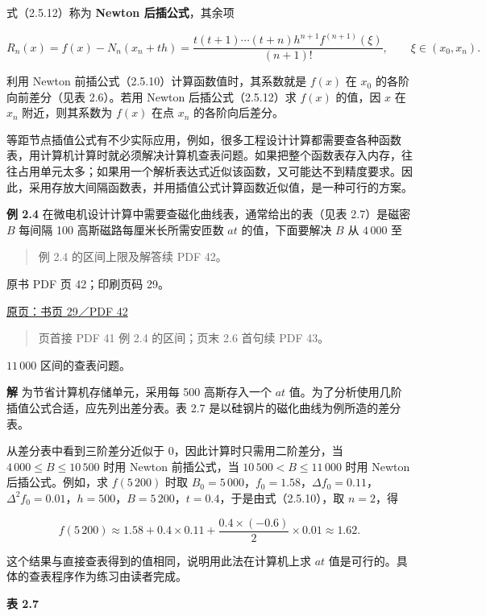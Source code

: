 式（2.5.12）称为 \textbf{Newton 后插公式}，其余项

\[
R_n(x)=f(x)-N_n(x_n+th)=\frac{t(t+1)\cdots(t+n)h^{n+1}f^{(n+1)}(\xi)}{(n+1)!},\qquad\xi\in(x_0,x_n).
\]

利用 Newton 前插公式（2.5.10）计算函数值时，其系数就是 \(f(x)\) 在 \(x_0\) 的各阶向前差分（见表 2.6）。若用 Newton 后插公式（2.5.12）求 \(f(x)\) 的值，因 \(x\) 在 \(x_n\) 附近，则其系数为 \(f(x)\) 在点 \(x_n\) 的各阶向后差分。

等距节点插值公式有不少实际应用，例如，很多工程设计计算都需要查各种函数表，用计算机计算时就必须解决计算机查表问题。如果把整个函数表存入内存，往往占用单元太多；如果用一个解析表达式近似该函数，又可能达不到精度要求。因此，采用存放大间隔函数表，并用插值公式计算函数近似值，是一种可行的方案。

\textbf{例 2.4} 在微电机设计计算中需要查磁化曲线表，通常给出的表（见表 2.7）是磁密 \(B\) 每间隔 100 高斯磁路每厘米长所需安匝数 \(at\) 的值，下面要解决 \(B\) 从 \(4\,000\) 至

\begin{quote}
例 2.4 的区间上限及解答续 PDF 42。
\end{quote}

\clearpage

原书 PDF 页 42；印刷页码 29。

\href{source-images/pdf-042.jpeg}{原页：书页 29／PDF 42}

\begin{quote}
页首接 PDF 41 例 2.4 的区间；页末 2.6 首句续 PDF 43。
\end{quote}

\(11\,000\) 区间的查表问题。

\textbf{解} 为节省计算机存储单元，采用每 500 高斯存入一个 \(at\) 值。为了分析使用几阶插值公式合适，应先列出差分表。表 2.7 是以硅钢片的磁化曲线为例所造的差分表。

从差分表中看到三阶差分近似于 0，因此计算时只需用二阶差分，当 \(4\,000\le B\le10\,500\) 时用 Newton 前插公式，当 \(10\,500<B\le11\,000\) 时用 Newton 后插公式。例如，求 \(f(5\,200)\) 时取 \(B_0=5\,000\)，\(f_0=1.58\)，\(\Delta f_0=0.11\)，\(\Delta^2 f_0=0.01\)，\(h=500\)，\(B=5\,200\)，\(t=0.4\)，于是由式（2.5.10），取 \(n=2\)，得

\[
f(5\,200)\approx1.58+0.4\times0.11+\frac{0.4\times(-0.6)}{2}\times0.01\approx1.62.
\]

这个结果与直接查表得到的值相同，说明用此法在计算机上求 \(at\) 值是可行的。具体的查表程序作为练习由读者完成。

\textbf{表 2.7}

